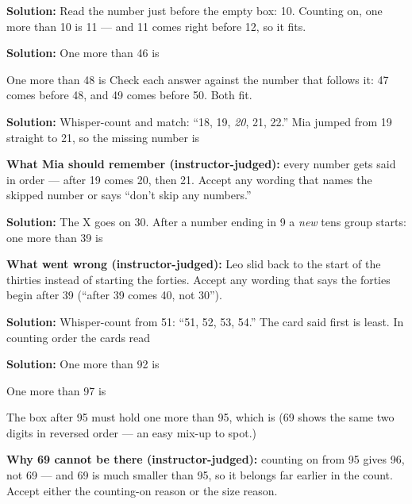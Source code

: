 \documentclass[12pt]{article}
\begin{document}



\textbf{Solution:} Read the number just before the empty box: 10. Counting on,
one more than 10 is 11 --- and 11 comes right before 12, so it fits. 


\textbf{Solution:} One more than 46 is 

One more than 48 is  \quad Check each answer against the number that
follows it: 47 comes before 48, and 49 comes before 50. Both fit.


\textbf{Solution:} Whisper-count and match: ``18, 19, \emph{20}, 21, 22.''
Mia jumped from 19 straight to 21, so the missing number is 

\textbf{What Mia should remember (instructor-judged):} every number gets said
in order --- after 19 comes 20, then 21. Accept any wording that names the
skipped number or says ``don't skip any numbers.''


\textbf{Solution:} The X goes on 30. After a number ending in 9 a \emph{new}
tens group starts: one more than 39 is 

\textbf{What went wrong (instructor-judged):} Leo slid back to the start of
the thirties instead of starting the forties. Accept any wording that says the
forties begin after 39 (``after 39 comes 40, not 30'').


\textbf{Solution:} Whisper-count from 51: ``51, 52, 53, 54.'' The card said
first is least. In counting order the cards read 


\textbf{Solution:} One more than 92 is 

One more than 97 is 

The box after 95 must hold one more than 95, which is  \quad (69 shows
the same two digits in reversed order --- an easy mix-up to spot.)

\textbf{Why 69 cannot be there (instructor-judged):} counting on from 95 gives
96, not 69 --- and 69 is much smaller than 95, so it belongs far earlier in
the count. Accept either the counting-on reason or the size reason.
\end{document}
